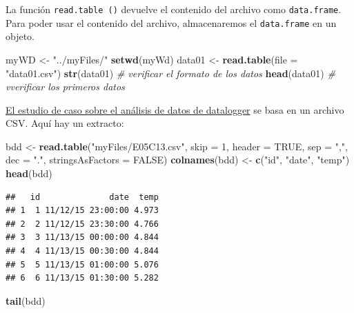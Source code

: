 \documentclass[
]{book}
\newenvironment{Shaded}{\begin{snugshade}}{\end{snugshade}}
\newcommand{\CommentTok}[1]{\textcolor[rgb]{0.56,0.35,0.01}{\textit{#1}}}
\newcommand{\DataTypeTok}[1]{\textcolor[rgb]{0.13,0.29,0.53}{#1}}
\newcommand{\DecValTok}[1]{\textcolor[rgb]{0.00,0.00,0.81}{#1}}
\newcommand{\KeywordTok}[1]{\textcolor[rgb]{0.13,0.29,0.53}{\textbf{#1}}}
\newcommand{\NormalTok}[1]{#1}
\newcommand{\OtherTok}[1]{\textcolor[rgb]{0.56,0.35,0.01}{#1}}
\newcommand{\StringTok}[1]{\textcolor[rgb]{0.31,0.60,0.02}{#1}}
\begin{document}
La función \texttt{read.table\ ()} devuelve el contenido del archivo como \texttt{data.frame}. Para poder usar el contenido del archivo, almacenaremos el \texttt{data.frame} en un objeto.

\begin{Shaded}
\begin{Highlighting}[]
\NormalTok{myWD <-}\StringTok{ "../myFiles/"}
\KeywordTok{setwd}\NormalTok{(myWd)}
\NormalTok{data01 <-}\StringTok{ }\KeywordTok{read.table}\NormalTok{(}\DataTypeTok{file =} \StringTok{"data01.csv"}\NormalTok{)}
\KeywordTok{str}\NormalTok{(data01) }\CommentTok{# verificar el formato de los datos}
\KeywordTok{head}\NormalTok{(data01) }\CommentTok{# vverificar los primeros datos}
\end{Highlighting}
\end{Shaded}

\protect\hyperlink{studyCase001}{El estudio de caso sobre el análisis de datos de datalogger} se basa en un archivo CSV. Aquí hay un extracto:

\begin{Shaded}
\begin{Highlighting}[]
\NormalTok{bdd <-}\StringTok{ }\KeywordTok{read.table}\NormalTok{(}\StringTok{"myFiles/E05C13.csv"}\NormalTok{, }\DataTypeTok{skip =} \DecValTok{1}\NormalTok{, }\DataTypeTok{header =} \OtherTok{TRUE}\NormalTok{, }
  \DataTypeTok{sep =} \StringTok{","}\NormalTok{, }\DataTypeTok{dec =} \StringTok{"."}\NormalTok{, }\DataTypeTok{stringsAsFactors =} \OtherTok{FALSE}\NormalTok{)}
\KeywordTok{colnames}\NormalTok{(bdd) <-}\StringTok{ }\KeywordTok{c}\NormalTok{(}\StringTok{"id"}\NormalTok{, }\StringTok{"date"}\NormalTok{, }\StringTok{"temp"}\NormalTok{)}
\KeywordTok{head}\NormalTok{(bdd)}
\end{Highlighting}
\end{Shaded}

\begin{verbatim}
##   id              date  temp
## 1  1 11/12/15 23:00:00 4.973
## 2  2 11/12/15 23:30:00 4.766
## 3  3 11/13/15 00:00:00 4.844
## 4  4 11/13/15 00:30:00 4.844
## 5  5 11/13/15 01:00:00 5.076
## 6  6 11/13/15 01:30:00 5.282
\end{verbatim}

\begin{Shaded}
\begin{Highlighting}[]
\KeywordTok{tail}\NormalTok{(bdd)}
\end{Highlighting}
\end{Shaded}
\end{document}
